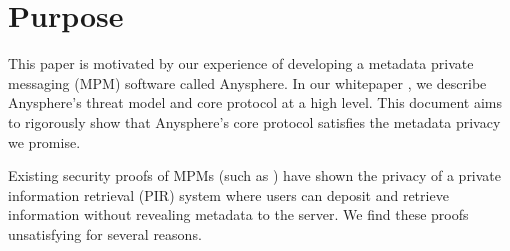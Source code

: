 \section{Purpose}
\label{sec:purpose}
This paper is motivated by our experience of developing a metadata private messaging (MPM) software called Anysphere. In our whitepaper \cite[Section 3]{whitepaper}, we describe Anysphere's threat model and core protocol at a high level. This document aims to rigorously show that Anysphere's core protocol satisfies the metadata privacy we promise. 

Existing security proofs of MPMs (such as \cite{corrigan2010dissent, corrigan2015riposte, angel2016unobservable, ahmad2021addra}) have shown the privacy of a private information retrieval (PIR) system where users can deposit and retrieve information without revealing metadata to the server. We find these proofs unsatisfying for several reasons.
